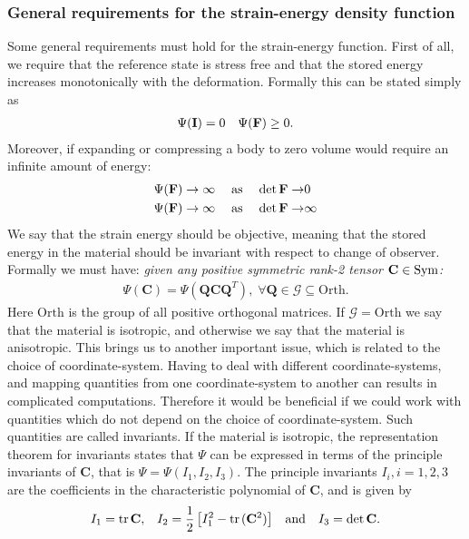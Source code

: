 \subsubsection{General requirements for the strain-energy density
  function}
\label{sec:strain_energy_req}
Some general requirements must hold for the strain-energy function.
First of all, we require that the reference state is stress free and
that the stored energy increases monotonically with the deformation. 
Formally this can be stated simply as 
\begin{align*}
  \Psi(\mathbf{I}) = 0 && \Psi(\mathbf{F}) \geq 0.
\end{align*}
Moreover, if expanding or compressing a body to zero volume would
require an infinite amount of energy:
\begin{align*}
  \Psi(\mathbf{F}) \rightarrow \infty \; && \text{as} &&\; \det \mathbf{F} \rightarrow& 0 \\
  \Psi(\mathbf{F}) \rightarrow \infty \; && \text{as} &&\; \det \mathbf{F} \rightarrow& \infty
\end{align*}
We say that the strain energy should be objective, meaning that the
stored energy in the material should be invariant with respect to
change of observer. Formally we must have: \emph{given any positive symmetric
rank-2 tensor $\mathbf{C} \in \mathrm{Sym}$:}
\begin{align}
  \Psi(\mathbf{C}) = \Psi(\mathbf{Q}\mathbf{C}\mathbf{Q}^T), \; \forall \mathbf{Q} \in \mathcal{G} \subseteq \mathrm{Orth}.
\end{align}
Here $\mathrm{Orth}$ is the group of all positive orthogonal matrices.
If $\mathcal{G} = \mathrm{Orth}$ we say that the material is
isotropic, and otherwise we say that the material is anisotropic.
This brings us to another important issue, which is related to the
choice of coordinate-system. Having to deal with different
coordinate-systems, and mapping quantities from one coordinate-system
to another can results in complicated computations. Therefore it would be beneficial if we
could work with quantities which do not depend on the choice of
coordinate-system. Such quantities are called invariants. 
If the material is isotropic, the representation theorem for
invariants states that $\Psi$ can be expressed in terms of the
principle invariants of $\mathbf{C}$, that is $\Psi = \Psi(I_1, I_2,
I_3)$. The principle invariants $I_i, i=1,2,3$ are the coefficients in
the characteristic polynomial of $\mathbf{C}$, and is given by 
\begin{align}
  I_1 = \mathrm{tr} \hspace{0.05cm} \mathbf{C},  && I_2 = \frac{1}{2}\left[ I_1^2 - \mathrm{tr} \hspace{0.05cm}(\mathbf{C}^2)\right] && \text{and} && I_3 = \det \mathbf{C}.
\end{align}
